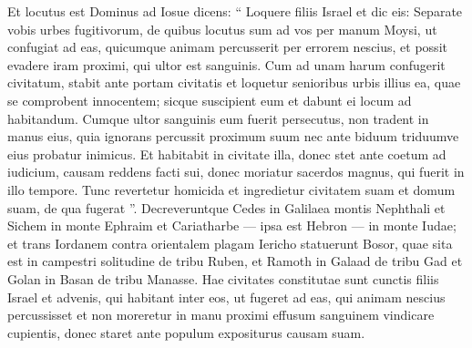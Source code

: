 \begin{biblechapter}
\begin{biblechapter}
\begin{biblechapter}
\begin{biblechapter}
\begin{biblechapter}
\begin{biblechapter}
\begin{biblechapter}
\begin{biblechapter}
\begin{biblechapter}
\begin{biblechapter}
\begin{biblechapter}
\begin{biblechapter}
\begin{biblechapter}
\begin{biblechapter}
\begin{biblechapter}
\begin{biblechapter}
\begin{biblechapter}
\begin{biblechapter}
\begin{biblechapter}
\begin{biblechapter}
\verse Et locutus est Dominus ad Iosue dicens: “ Loquere filiis Israel et dic eis: 
\verse Separate vobis urbes fugitivorum, de quibus locutus sum ad vos per manum Moysi, 
\verse ut confugiat ad eas, quicumque animam percusserit per errorem nescius, et possit evadere iram proximi, qui ultor est sanguinis. 
\verse Cum ad unam harum confugerit civitatum, stabit ante portam civitatis et loquetur senioribus urbis illius ea, quae se comprobent innocentem; sicque suscipient eum et dabunt ei locum ad habitandum. 
\verse Cumque ultor sanguinis eum fuerit persecutus, non tradent in manus eius, quia ignorans percussit proximum suum nec ante biduum triduumve eius probatur inimicus. 
\verse Et habitabit in civitate illa, donec stet ante coetum ad iudicium, causam reddens facti sui, donec moriatur sacerdos magnus, qui fuerit in illo tempore. Tunc revertetur homicida et ingredietur civitatem suam et domum suam, de qua fugerat ”.
 \verse Decreveruntque Cedes in Galilaea montis Nephthali et Sichem in monte Ephraim et Cariatharbe — ipsa est Hebron — in monte Iudae; 
\verse et trans Iordanem contra orientalem plagam Iericho statuerunt Bosor, quae sita est in campestri solitudine de tribu Ruben, et Ramoth in Galaad de tribu Gad et Golan in Basan de tribu Manasse.
 \verse Hae civitates constitutae sunt cunctis filiis Israel et advenis, qui habitant inter eos, ut fugeret ad eas, qui animam nescius percussisset et non moreretur in manu proximi effusum sanguinem vindicare cupientis, donec staret ante populum expositurus causam suam.
 

\end{biblechapter}
\end{biblechapter}
\end{biblechapter}
\end{biblechapter}
\end{biblechapter}
\end{biblechapter}
\end{biblechapter}
\end{biblechapter}
\end{biblechapter}
\end{biblechapter}
\end{biblechapter}
\end{biblechapter}
\end{biblechapter}
\end{biblechapter}
\end{biblechapter}
\end{biblechapter}
\end{biblechapter}
\end{biblechapter}
\end{biblechapter}
\end{biblechapter}
